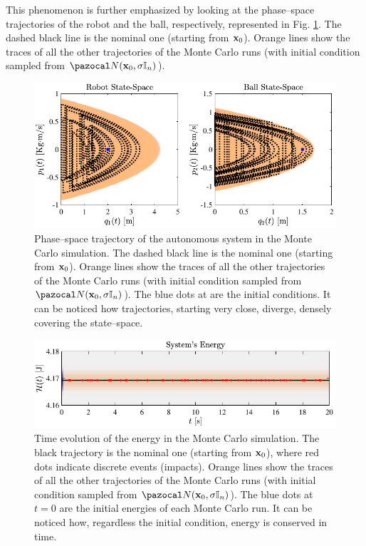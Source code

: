 This phenomenon is further emphasized by looking at the phase--space trajectories of the robot and the ball, respectively, represented in Fig. \ref{fig:chaos2}. The dashed black line is the nominal one (starting from $\mathbf{x}_0$). Orange lines show the traces of all the other trajectories of the Monte Carlo runs (with initial condition sampled from $\N(\xb_0,\sigma\mathbb{I}_n)$). 
%
\begin{figure}[!h]
    \centering
    \includegraphics[width = \linewidth]{Figures/chaos2.pdf}
    \caption[Phase--space trajectory of the autonomous system in the Monte Carlo simulation]{Phase--space trajectory of the autonomous system in the Monte Carlo simulation. The dashed black line is the nominal one (starting from $\mathbf{x}_0$). Orange lines show the traces of all the other trajectories of the Monte Carlo runs (with initial condition sampled from $\N(\xb_0,\sigma\mathbb{I}_n)$). The blue dots at are the initial conditions. It can be noticed how trajectories, starting very close, diverge, densely covering the state--space.}
    \label{fig:chaos2}
\end{figure}
%
\begin{figure}[!h]
    \centering
    \includegraphics[width = \linewidth]{Figures/chaos3.pdf}
    \caption[Time evolution of the energy in the Monte Carlo simulation]{Time evolution of the energy in the Monte Carlo simulation. The black trajectory is the nominal one (starting from $\mathbf{x}_0$), where red dots indicate discrete events (impacts). Orange lines show the traces of all the other trajectories of the Monte Carlo runs (with initial condition sampled from $\N(\xb_0,\sigma\mathbb{I}_n)$). The blue dots at $t=0$ are the initial energies of each Monte Carlo run. It can be noticed how, regardless the initial condition, energy is conserved in time.}
    \label{fig:chaos3}
\end{figure}

